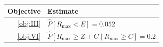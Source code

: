 \begin{tabularx}{\linewidth}{r>{\centering\arraybackslash}X}
\toprule  Objective & Estimate\\\midrule
  \ref{obj:III} & $\hat{P}[R_{\max} < E] = 0.052$\\\addlinespace
  \ref{obj:VI} & $\hat{P}[R_{\max} \ge Z + C \mid R_{\max} \ge C] = 0.2$\\\bottomrule
\end{tabularx}
